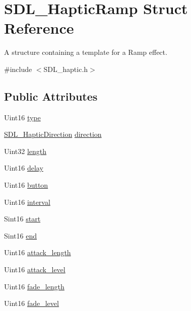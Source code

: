 \hypertarget{structSDL__HapticRamp}{\section{S\+D\+L\+\_\+\+Haptic\+Ramp Struct Reference}
\label{structSDL__HapticRamp}
}


A structure containing a template for a Ramp effect.  




{\ttfamily \#include $<$S\+D\+L\+\_\+haptic.\+h$>$}

\subsection*{Public Attributes}
\begin{DoxyCompactItemize}
\item 
Uint16 \hyperlink{structSDL__HapticRamp_aca1c2349372433822ab62f60976640aa}{type}
\item 
\hyperlink{structSDL__HapticDirection}{S\+D\+L\+\_\+\+Haptic\+Direction} \hyperlink{structSDL__HapticRamp_a6fb6c67ccf262b8f3ec08bcdf08f9965}{direction}
\item 
Uint32 \hyperlink{structSDL__HapticRamp_a57e75237507701405af2a3caf34cdb5a}{length}
\item 
Uint16 \hyperlink{structSDL__HapticRamp_ac9471016f41919b4a1c786bbd649a777}{delay}
\item 
Uint16 \hyperlink{structSDL__HapticRamp_a2027c6fd88f1ebe652c90c71410ee0bf}{button}
\item 
Uint16 \hyperlink{structSDL__HapticRamp_a4b89d108cfa7e96ea58b58771334c33d}{interval}
\item 
Sint16 \hyperlink{structSDL__HapticRamp_acc0e813ac6399290fd4a788d2471e8d4}{start}
\item 
Sint16 \hyperlink{structSDL__HapticRamp_a16dd3ee307795248e21ee45ba8fb4c6c}{end}
\item 
Uint16 \hyperlink{structSDL__HapticRamp_adbcd7ffb05016d442c73e81cc0fcbbd2}{attack\+\_\+length}
\item 
Uint16 \hyperlink{structSDL__HapticRamp_a755933bbda14ae9b53c574b9fe6291a0}{attack\+\_\+level}
\item 
Uint16 \hyperlink{structSDL__HapticRamp_ad58a8f7cfdf659b45f0503fc56db7436}{fade\+\_\+length}
\item 
Uint16 \hyperlink{structSDL__HapticRamp_a66b586f2e6a23a085a7b2854f61752c5}{fade\+\_\+level}
\end{DoxyCompactItemize}


